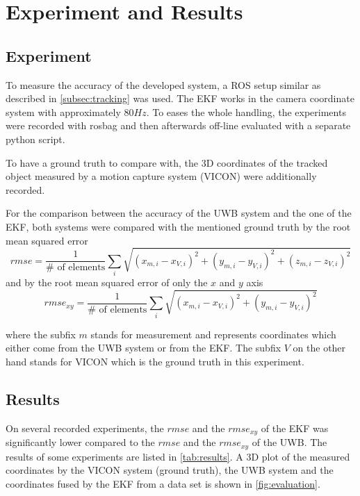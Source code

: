\chapter{Experiment and Results}

\section{Experiment}
To measure the accuracy of the developed system, a \ac{ROS} setup similar as described in \autoref{subsec:tracking} was used. The \acf{EKF} works in the camera coordinate system with approximately $80\mathit{Hz}$. To eases the whole handling, the experiments were recorded with rosbag and then afterwards off-line evaluated with a separate python script.

To have a ground truth to compare with, the 3D coordinates of the tracked object measured by a motion capture system (VICON) were additionally recorded.

For the comparison between the accuracy of the \ac{UWB} system and the one of the \ac{EKF}, both systems were compared with the mentioned ground truth by the root mean squared error $$\textit{rmse} = \frac{1}{\#\text{ of elements}} \sum_i \sqrt{(x_{m,i} - x_{V,i})^2 + (y_{m,i} - y_{V,i})^2 + (z_{m,i} - z_{V,i})^2}$$
and by the root mean squared error of only the $x$ and $y$ axis
$$\textit{rmse}_{xy} = \frac{1}{\#\text{ of elements}} \sum_i \sqrt{(x_{m,i} - x_{V,i})^2 + (y_{m,i} - y_{V,i})^2}$$

where the subfix $m$ stands for measurement and represents coordinates which either come from the \ac{UWB} system or from the \ac{EKF}. The subfix $V$ on the other hand stands for VICON which is the ground truth in this experiment. 

\section{Results}
On several recorded experiments, the $\textit{rmse}$ and the $\textit{rmse}_{xy}$ of the \ac{EKF} was significantly lower compared to the $\textit{rmse}$ and the $\textit{rmse}_{xy}$ of the \ac{UWB}. The results of some experiments are listed in \autoref{tab:results}. A 3D plot of the measured coordinates by the VICON system (ground truth), the \ac{UWB} system and the coordinates fused by the \ac{EKF} from a data set is shown in \autoref{fig:evaluation}.

